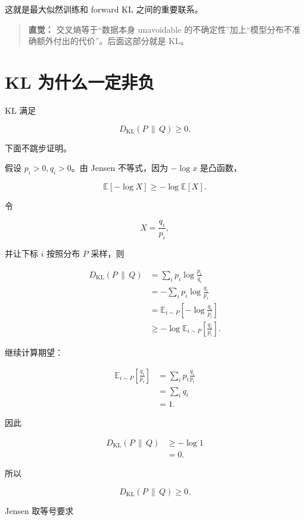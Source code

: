 \documentclass[11pt,a4paper]{ctexart}
\newcommand{\KL}[2]{D_{\mathrm{KL}}\!\left(#1\,\middle\|\,#2\right)}
\newcommand{\E}{\mathbb{E}}
\newenvironment{intuition}
{\begin{quote}\small\textbf{直觉：}}
{\end{quote}}
\begin{document}
这就是最大似然训练和 forward KL 之间的重要联系。

\begin{intuition}
交叉熵等于“数据本身 unavoidable 的不确定性”加上“模型分布不准确额外付出的代价”。后面这部分就是 KL。
\end{intuition}

\section{KL 为什么一定非负}

KL 满足

\begin{equation}
\boxed{
\KL{P}{Q}\ge 0.
}
\end{equation}

下面不跳步证明。

假设 $p_i>0,q_i>0$。由 Jensen 不等式，因为 $-\log x$ 是凸函数，

\begin{equation}
\E[-\log X]
\ge
-\log\E[X].
\end{equation}

令

\[
X=\frac{q_i}{p_i},
\]

并让下标 $i$ 按照分布 $P$ 采样，则

\begin{align}
\KL{P}{Q}
&=
\sum_i p_i\log\frac{p_i}{q_i}
\\
&=
-\sum_i p_i\log\frac{q_i}{p_i}
\\
&=
\E_{i\sim P}
\left[
-\log\frac{q_i}{p_i}
\right]
\\
&\ge
-\log
\E_{i\sim P}
\left[
\frac{q_i}{p_i}
\right].
\end{align}

继续计算期望：

\begin{align}
\E_{i\sim P}
\left[
\frac{q_i}{p_i}
\right]
&=
\sum_i
p_i\frac{q_i}{p_i}
\\
&=
\sum_i q_i
\\
&=
1.
\end{align}

因此

\begin{align}
\KL{P}{Q}
&\ge
-\log 1
\\
&=
0.
\end{align}

所以

\[
\boxed{
\KL{P}{Q}\ge0.
}
\]

Jensen 取等号要求
\end{document}
